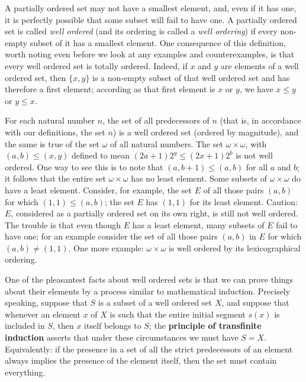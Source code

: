 
A partially ordered set may not have a smallest element, and, even if it has one, it is perfectly possible that some subset will fail to have one. A partially ordered set is called \textit{well ordered} (and its ordering is called a \textit{well ordering}) if every non-empty subset of it has a smallest element. One consequence of this definition, worth noting even before we look at any examples and counterexamples, is that every well ordered set is totally ordered. Indeed, if $x$ and $y$ are elements of a well ordered set, then $\{ x,y \}$ is a non-empty subset of that well ordered set and has therefore a first element; according as that first element is $x$ or $y$, we have $x \le y$ or $y \le x$.

For each natural number $n$, the set of all predecessors of $n$ (that is, in accordance with our definitions, the set $n$) is a well ordered set (ordered by magnitude), and the same is true of the set $\omega$ of all natural numbers. The set $\omega \times \omega $, with $(a,b) \le (x,y)$ defined to mean $(2a + 1)2^{y} \le (2x + 1)2^{b}$ is not well ordered. One way to see this is to note that $(a,b + 1) \le (a,b)$ for all $a$ and $b$; it follows that the entire set $\omega \times \omega$ has no least element. Some subsets of $\omega \times \omega$ do have a least element. Consider, for example, the set $E$ of all those pairs $(a, b)$ for which $(1,1) \le (a,b)$; the set $E$ has $(1, 1)$ for its least element. Caution: $E$, considered as a partially ordered set on its own right, is still not well ordered. The trouble is that even though $E$ has a least element, many subsets of $E$ fail to have one; for an example consider the set of all those pairs $(a,b)$ in $E$ for which $(a,b) \neq (1, 1)$. One more example: $\omega \times \omega$ is well ordered by its lexicographical ordering. 

One of the pleasantest facts about well ordered sets is that we can prove things about their elements by a process similar to mathematical induction. Precisely speaking, suppose that $S$ is a subset of a well ordered set $X$, and suppose that whenever an element $x$ of $X$ is such that the entire initial segment $s(x)$ is included in $S$, then $x$ itself belongs to $S$; the \textbf{principle of transfinite induction} asserts that under these circumstances we must have $S = X$. Equivalently: if the presence in a set of all the strict predecessors of an element always implies the presence of the element itself, then the set must contain everything. 

